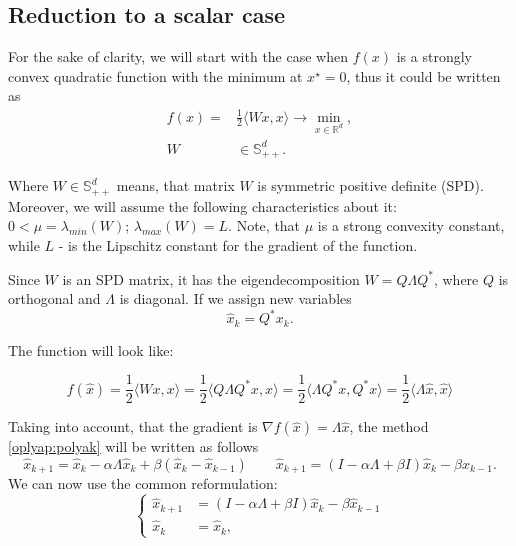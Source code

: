 \documentclass[a4paper,11pt]{article}
\begin{document}
\subsection{Reduction to a scalar case}
\label{oplyap:sec:reduction_to_a_scalar}
For the sake of clarity, we will start with the case when $f(x)$ is a strongly convex quadratic function with the minimum at $x^\star = 0$, thus it could be written as 
\begin{equation}
 \label{oplyap:eq:original_problem}
 \begin{split}
 f(x) = & \frac12 \langle Wx, x\rangle \to \min_{x \in \mathbb{R}^d},\\ 
 W &\in \mathbb{S}^d_{++}.
 \end{split}
\end{equation}

Where $W \in \mathbb{S}^d_{++}$ means, that matrix $W$ is symmetric positive definite (SPD). Moreover, we will assume the following characteristics about it: $0 < \mu = \lambda_{min}(W)$; $\lambda_{max}(W) = L$. Note, that $\mu$ is a strong convexity constant, while $L$ - is the Lipschitz constant for the gradient of the function.

Since $W$ is an SPD matrix, it has the eigendecomposition $W = Q \Lambda Q^*$, where $Q$ is orthogonal and $\Lambda$ is diagonal. If we assign new variables 
\begin{equation}
 \label{change_var}
 \hat{x}_{k} = Q^* x_k.
\end{equation}

The function will look like:

\begin{equation}
f(\hat{x}) = \frac12 \langle W x, x \rangle = \frac12 \langle Q \Lambda Q^* x, x \rangle = \frac12 \langle \Lambda Q^* x , Q^* x \rangle = \frac12 \langle \Lambda\hat{x}, \hat{x}\rangle
\end{equation}

Taking into account, that the gradient is $\nabla f(\hat{x}) = \Lambda \hat{x}$, the method \eqref{oplyap:polyak} will be written as follows
\begin{equation}\label{oplyap:lin}
 \hat{x}_{k+1} = \hat{x}_k - \alpha \Lambda \hat{x}_k + \beta (\hat{x}_k - \hat{x}_{k-1})\qquad
 \hat{x}_{k+1} = (I - \alpha \Lambda + \beta I) \hat{x}_k - \beta \hat{x}_{k-1}.
\end{equation}
We can now use the common reformulation:
\begin{equation}
 \begin{cases}
 \hat{x}_{k+1} &= (I - \alpha \Lambda + \beta I) \hat{x}_k - \beta \hat{x}_{k-1} \\
 \hat{x}_{k} &= \hat{x}_k,
 \end{cases}
\end{equation}
\end{document}
